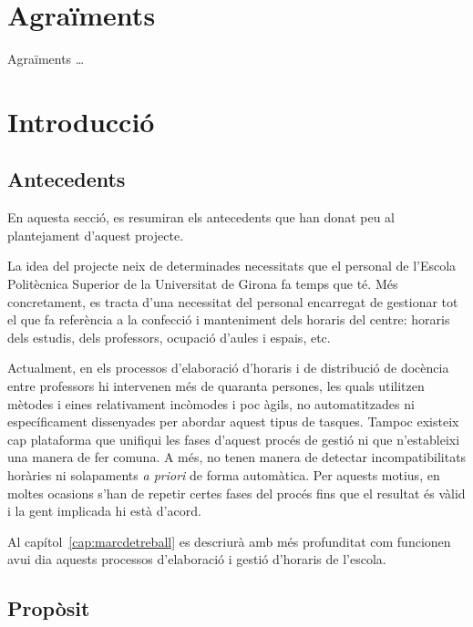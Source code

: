 \documentclass[a4paper,12pt]{ThesisStyle}
\begin{document}
\let\cleardoublepage\clearpage
{}
\frontmatter
\dominitoc

\chapter*{Agraïments}
\label{cap:agraiments}

Agraïments \ldots


\tableofcontents
\listoffigures
\listoftables

\mainmatter

\chapter{Introducció}
\label{cap:intro}

\section{Antecedents}
\label{sec:antecedents}

En aquesta secció, es resumiran els antecedents que han donat peu al plantejament d'aquest projecte.

La idea del projecte neix de determinades necessitats que el personal de l'Escola Politècnica Superior de la Universitat de Girona fa temps que té. Més concretament, es tracta d'una necessitat del personal encarregat de gestionar tot el que fa referència a la confecció i manteniment dels horaris del centre: horaris dels estudis, dels professors, ocupació d'aules i espais, etc.

Actualment, en els processos d'elaboració d'horaris i de distribució de docència entre professors hi intervenen més de quaranta persones, les quals utilitzen mètodes i eines relativament incòmodes i poc àgils, no automatitzades ni específicament dissenyades per abordar aquest tipus de tasques. Tampoc existeix cap plataforma que unifiqui les fases d'aquest procés de gestió ni que n'estableixi una manera de fer comuna. A més, no tenen manera de detectar incompatibilitats horàries ni solapaments \textit{a priori} de forma automàtica. Per aquests motius, en moltes ocasions s'han de repetir certes fases del procés fins que el resultat és vàlid i la gent implicada hi està d'acord.

Al capítol~\ref{cap:marcdetreball} es descriurà amb més profunditat com funcionen avui dia aquests processos d'elaboració i gestió d'horaris de l'escola.

\section{Propòsit}
\label{sec:proposit}
\end{document}
